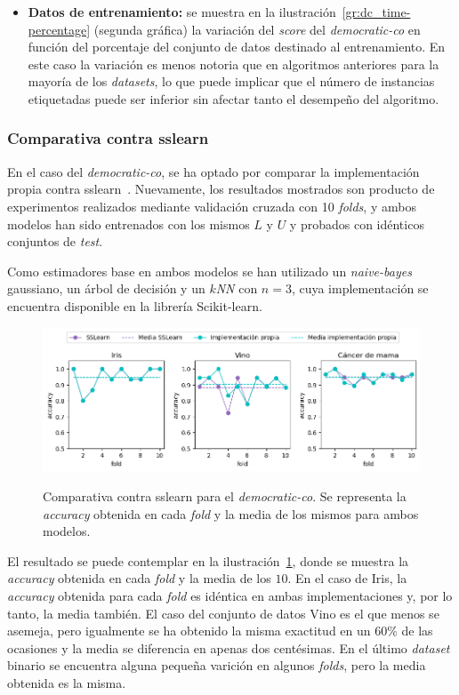 \begin{itemize}
	\item \textbf{Datos de entrenamiento:} se muestra en la ilustración~\ref{gr:dc_time-percentage} (segunda gráfica) la variación del \textit{score} del \textit{democratic-co} en función del porcentaje del conjunto de datos destinado al entrenamiento. En este caso la variación es menos notoria que en algoritmos anteriores para la mayoría de los \textit{datasets}, lo que puede implicar que el número de instancias etiquetadas puede ser inferior sin afectar tanto el desempeño del algoritmo.
	
	
\end{itemize} 


\subsubsection{Comparativa contra sslearn}

En el caso del \textit{democratic-co}, se ha optado por comparar la implementación propia contra sslearn~\cite{sslearnRepo}. Nuevamente, los resultados mostrados son producto de experimentos realizados mediante validación cruzada con 10 \textit{folds}, y ambos modelos han sido entrenados con los mismos $L$ y $U$ y probados con idénticos conjuntos de \textit{test}.

Como estimadores base en ambos modelos se han utilizado un \textit{naive-bayes} gaussiano, un árbol de decisión y un \textit{$k$NN} con $n = 3$, cuya implementación se encuentra disponible en la librería Scikit-learn.

\begin{figure}[h]
	\caption[\textit{Democratic-co}: comparativa contra sslearn]{Comparativa contra sslearn para el \textit{democratic-co}. Se representa la \textit{accuracy} obtenida en cada \textit{fold} y la media de los mismos para ambos modelos.}
	\centering
	\includegraphics[scale=0.62]{../img/memoria/5_democraticco_sslearn}
	\label{gr:dc_vs_sslearn}
\end{figure}

El resultado se puede contemplar en la ilustración~\ref{gr:dc_vs_sslearn}, donde se muestra la \textit{accuracy} obtenida en cada \textit{fold} y la media de los $10$. En el caso de Iris, la \textit{accuracy} obtenida para cada \textit{fold} es idéntica en ambas implementaciones y, por lo tanto, la media también. El caso del conjunto de datos Vino es el que menos se asemeja, pero igualmente se ha obtenido la misma exactitud en un 60\% de las ocasiones y la media se diferencia en apenas dos centésimas. En el último \textit{dataset} binario se encuentra alguna pequeña varición en algunos \textit{folds}, pero la media obtenida es la misma.

